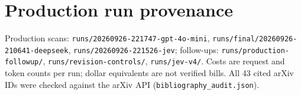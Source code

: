 \section{Production run provenance}
\label{app:provenance}
Production scans: \texttt{runs/20260926-221747-gpt-4o-mini},
\texttt{runs/final/20260926-210641-deepseek}, \texttt{runs/20260926-221526-jev};
follow-ups: \texttt{runs/production-followup/}, \texttt{runs/revision-controls/},
\texttt{runs/jev-v4/}.  Costs are request and token counts per run; dollar equivalents
are not verified bills.  All 43 cited arXiv IDs were checked against the arXiv API
(\texttt{bibliography\_audit.json}).
